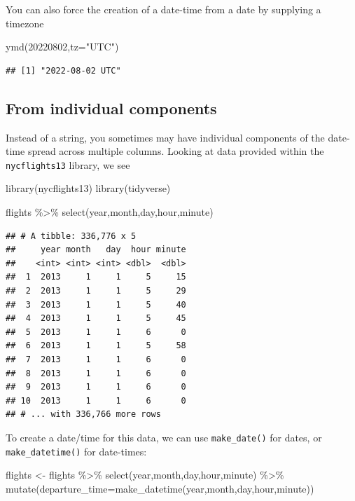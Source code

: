 \documentclass[
]{book}
\newenvironment{Shaded}{\begin{snugshade}}{\end{snugshade}}
\newcommand{\AttributeTok}[1]{\textcolor[rgb]{0.77,0.63,0.00}{#1}}
\newcommand{\DecValTok}[1]{\textcolor[rgb]{0.00,0.00,0.81}{#1}}
\newcommand{\FunctionTok}[1]{\textcolor[rgb]{0.00,0.00,0.00}{#1}}
\newcommand{\NormalTok}[1]{#1}
\newcommand{\OtherTok}[1]{\textcolor[rgb]{0.56,0.35,0.01}{#1}}
\newcommand{\SpecialCharTok}[1]{\textcolor[rgb]{0.00,0.00,0.00}{#1}}
\newcommand{\StringTok}[1]{\textcolor[rgb]{0.31,0.60,0.02}{#1}}
\begin{document}
You can also force the creation of a date-time from a date by supplying a timezone

\begin{Shaded}
\begin{Highlighting}[]
\FunctionTok{ymd}\NormalTok{(}\DecValTok{20220802}\NormalTok{,}\AttributeTok{tz=}\StringTok{"UTC"}\NormalTok{)}
\end{Highlighting}
\end{Shaded}

\begin{verbatim}
## [1] "2022-08-02 UTC"
\end{verbatim}

\hypertarget{from-individual-components}{%
\subsection{From individual components}\label{from-individual-components}}

Instead of a string, you sometimes may have individual components of the date-time spread across multiple columns. Looking at data provided within the \texttt{nycflights13} library, we see

\begin{Shaded}
\begin{Highlighting}[]
\FunctionTok{library}\NormalTok{(nycflights13)}
\FunctionTok{library}\NormalTok{(tidyverse)}

\NormalTok{flights }\SpecialCharTok{\%\textgreater{}\%}
  \FunctionTok{select}\NormalTok{(year,month,day,hour,minute)}
\end{Highlighting}
\end{Shaded}

\begin{verbatim}
## # A tibble: 336,776 x 5
##     year month   day  hour minute
##    <int> <int> <int> <dbl>  <dbl>
##  1  2013     1     1     5     15
##  2  2013     1     1     5     29
##  3  2013     1     1     5     40
##  4  2013     1     1     5     45
##  5  2013     1     1     6      0
##  6  2013     1     1     5     58
##  7  2013     1     1     6      0
##  8  2013     1     1     6      0
##  9  2013     1     1     6      0
## 10  2013     1     1     6      0
## # ... with 336,766 more rows
\end{verbatim}

To create a date/time for this data, we can use \texttt{make\_date()} for dates, or \texttt{make\_datetime()} for date-times:

\begin{Shaded}
\begin{Highlighting}[]
\NormalTok{flights }\OtherTok{\textless{}{-}}\NormalTok{ flights }\SpecialCharTok{\%\textgreater{}\%}
  \FunctionTok{select}\NormalTok{(year,month,day,hour,minute) }\SpecialCharTok{\%\textgreater{}\%}
  \FunctionTok{mutate}\NormalTok{(}\AttributeTok{departure\_time=}\FunctionTok{make\_datetime}\NormalTok{(year,month,day,hour,minute))}
\end{Highlighting}
\end{Shaded}
\end{document}

